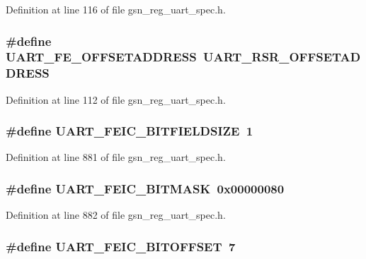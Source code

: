Definition at line 116 of file gsn\_\-reg\_\-uart\_\-spec.h.

\hypertarget{a00575_a84f997a66c8bfd5a0af7485ed8b99bf4}{
\subsubsection[{UART\_\-FE\_\-OFFSETADDRESS}]{\setlength{\rightskip}{0pt plus 5cm}\#define UART\_\-FE\_\-OFFSETADDRESS~UART\_\-RSR\_\-OFFSETADDRESS}}
\label{a00575_a84f997a66c8bfd5a0af7485ed8b99bf4}


Definition at line 112 of file gsn\_\-reg\_\-uart\_\-spec.h.

\hypertarget{a00575_a840c3d8f6e8f1dd0d44e94a7bbd08247}{
\subsubsection[{UART\_\-FEIC\_\-BITFIELDSIZE}]{\setlength{\rightskip}{0pt plus 5cm}\#define UART\_\-FEIC\_\-BITFIELDSIZE~1}}
\label{a00575_a840c3d8f6e8f1dd0d44e94a7bbd08247}


Definition at line 881 of file gsn\_\-reg\_\-uart\_\-spec.h.

\hypertarget{a00575_af2844e2f6bf29eded5d7d4c9fe4073a6}{
\subsubsection[{UART\_\-FEIC\_\-BITMASK}]{\setlength{\rightskip}{0pt plus 5cm}\#define UART\_\-FEIC\_\-BITMASK~0x00000080}}
\label{a00575_af2844e2f6bf29eded5d7d4c9fe4073a6}


Definition at line 882 of file gsn\_\-reg\_\-uart\_\-spec.h.

\hypertarget{a00575_ad1fb4ef210b82c39af9d5339b87ee109}{
\subsubsection[{UART\_\-FEIC\_\-BITOFFSET}]{\setlength{\rightskip}{0pt plus 5cm}\#define UART\_\-FEIC\_\-BITOFFSET~7}}
\label{a00575_ad1fb4ef210b82c39af9d5339b87ee109}


